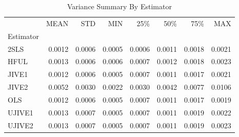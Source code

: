 \begin{table}[ht]
\centering
\caption{Variance Summary By Estimator}
\begin{tabular}{lrrrrrrr}
\toprule
 & MEAN & STD & MIN & 25\% & 50\% & 75\% & MAX \\
Estimator &  &  &  &  &  &  &  \\
\midrule
2SLS & 0.0012 & 0.0006 & 0.0005 & 0.0006 & 0.0011 & 0.0018 & 0.0021 \\
HFUL & 0.0013 & 0.0006 & 0.0006 & 0.0007 & 0.0012 & 0.0018 & 0.0023 \\
JIVE1 & 0.0012 & 0.0006 & 0.0005 & 0.0007 & 0.0011 & 0.0017 & 0.0021 \\
JIVE2 & 0.0052 & 0.0030 & 0.0022 & 0.0030 & 0.0042 & 0.0077 & 0.0106 \\
OLS & 0.0012 & 0.0006 & 0.0005 & 0.0007 & 0.0011 & 0.0017 & 0.0019 \\
UJIVE1 & 0.0013 & 0.0007 & 0.0005 & 0.0007 & 0.0011 & 0.0019 & 0.0022 \\
UJIVE2 & 0.0013 & 0.0007 & 0.0005 & 0.0007 & 0.0011 & 0.0019 & 0.0023 \\
\bottomrule
\end{tabular}
\end{table}
